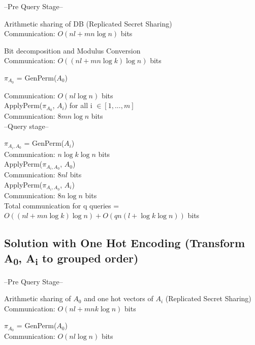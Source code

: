 --Pre Query Stage--

\textbullet{} Arithmetic sharing of DB (Replicated Secret Sharing) \\

Communication: $O(nl + mn\log n)$ bits 

\textbullet{} Bit decomposition and Modulus Conversion\\

Communication: $O((nl + mn\log k)\log n)$ bits 

\textbullet{} $\pi_{A_0}$ = GenPerm($A_0$)

Communication:  $O(nl\log n)$ bits \\

\textbullet{} ApplyPerm($\pi_{A_0}$, $A_i$) for all i $\in [1, ..., m]$ \\
Communication: $8mn\log n$ bits \\

--Query stage--

\textbullet{} $\pi_{A_i,A_0}$ = GenPerm($A_i$) \\
Communication: $n\log k\log n$ bits \\


\textbullet{} ApplyPerm($\pi_{A_i,A_0}$, $A_0$) \\
Communication: $8nl$ bits \\

\textbullet{} ApplyPerm($\pi_{A_i,A_0}$, $A_i$) \\
Communication: $8n\log n$ bits \\

Total communication for q queries =  $O((nl + mn\log k)\log n) + O(qn(l + \log k\log n))$ bits


\subsection{Solution with One Hot Encoding (Transform A\textsubscript{0}, A\textsubscript{i} to grouped order)}

--Pre Query Stage--

\textbullet{} Arithmetic sharing of $A_0$ and one hot vectors of $A_i$ (Replicated Secret Sharing) \\

Communication: $O(nl + mnk\log n)$ bits 

\textbullet{} $\pi_{A_0}$ = GenPerm($A_0$) \\

Communication: $O(nl \log n)$ bits 

